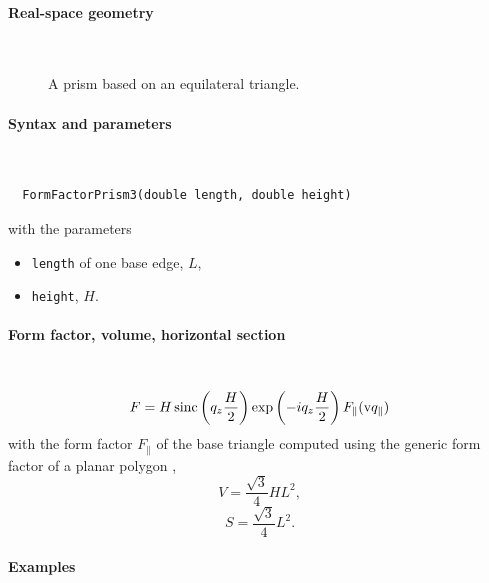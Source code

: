 \paragraph{Real-space geometry}\strut\\

\begin{figure}[H]
\hfill
{}
\hfill
{}
\hfill
{}
\hfill
\caption{A prism based on an equilateral triangle.}
\end{figure}

\FloatBarrier

\paragraph{Syntax and parameters}\strut\\[-2ex plus .2ex minus .2ex]
\begin{lstlisting}
  FormFactorPrism3(double length, double height)
\end{lstlisting}
with the parameters
\begin{itemize}
\item \texttt{length} of one base edge, $L$,
\item \texttt{height}, $H$.
\end{itemize}

\paragraph{Form factor, volume, horizontal section}\strut\\
\begin{equation*}
F = H \operatorname{sinc}\left(q_z\frac{H}{2}\right) \exp\left(-i q_z\frac{ H}{2}\right) F_\parallel(\text{v}{q}_\parallel)
\end{equation*}
with the form factor $F_\parallel$ of the base triangle
computed using the generic form factor of a planar polygon \cite{ba:ffp},
\begin{equation*}
  V= \dfrac{\sqrt{3}}{4} H L^2,
\end{equation*}
\begin{equation*}
  S =\dfrac{\sqrt{3}}{4}L^2.
\end{equation*}

\paragraph{Examples}\strut

